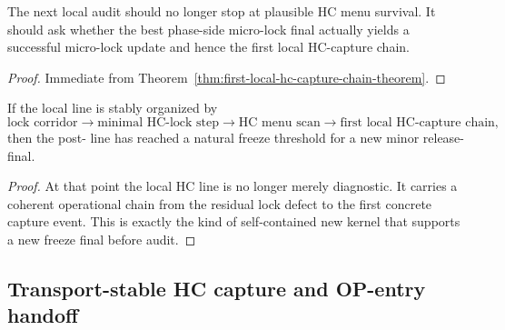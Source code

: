 \begin{corollary}
\label{cor:current-hc-capture-working-rule}
The next local audit should no longer stop at plausible HC menu survival. It should ask whether the best phase-side micro-lock final actually yields a successful micro-lock update and hence the first local HC-capture chain.
\end{corollary}

\begin{proof}
Immediate from Theorem~\ref{thm:first-local-hc-capture-chain-theorem}.
\end{proof}

\begin{corollary}
\label{cor:freeze-threshold-after-v3320}
If the local line is stably organized by
\[
 \text{lock corridor}
 \to
 \text{minimal HC-lock step}
 \to
 \text{HC menu scan}
 \to
 \text{first local HC-capture chain},
\]
then the post- line has reached a natural freeze threshold for a new minor release-final.
\end{corollary}

\begin{proof}
At that point the local HC line is no longer merely diagnostic. It carries a coherent operational chain from the residual lock defect to the first concrete capture event. This is exactly the kind of self-contained new kernel that supports a new freeze final before audit.
\end{proof}



\subsection{Transport-stable HC capture and OP-entry handoff}
\label{subsec:transport-stable-hc-capture-op-entry-handoff}

